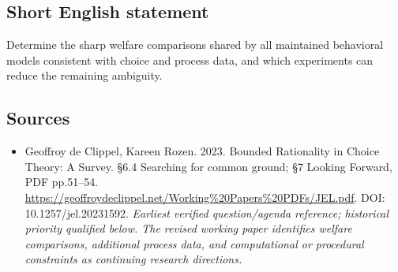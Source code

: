 \documentclass[11pt]{article}
\begin{document}
\subsection{Short English statement}
Determine the sharp welfare comparisons shared by all maintained behavioral models consistent with choice and process data, and which experiments can reduce the remaining ambiguity.

\subsection{Sources}
\begin{itemize}\raggedright
\item[\textnormal{[S1]}]\hypertarget{source:30007554:1}{} Geoffroy de Clippel, Kareen Rozen. 2023. Bounded Rationality in Choice Theory: A Survey. §6.4 Searching for common ground; §7 Looking Forward, PDF pp.51–54.
\url{https://geoffroydeclippel.net/Working%20Papers%20PDFs/JEL.pdf}.
DOI: 10.1257/jel.20231592.
{\small\textit{Earliest verified question/agenda reference; historical priority qualified below. The revised working paper identifies welfare comparisons, additional process data, and computational or procedural constraints as continuing research directions.}}
\end{itemize}
\end{document}
